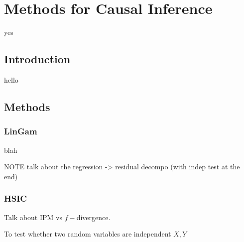 \chapter{Methods for Causal Inference}

yes

\section{Introduction}

hello

\section{Methods}

\subsection{LinGam}

blah

NOTE talk about the regression -> residual decompo (with indep test at the end)

\subsection{HSIC}

Talk about IPM vs $f-$divergence. 

To test whether two random variables are independent $X, Y$